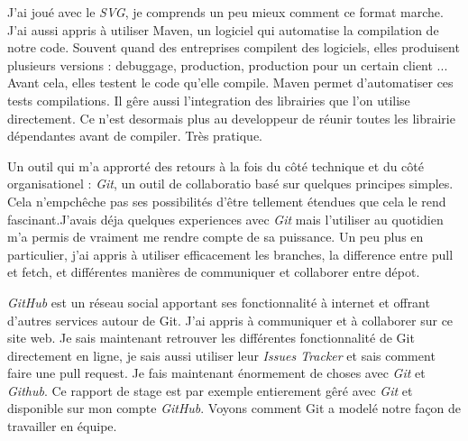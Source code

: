 J'ai joué avec le \textit{SVG}, je comprends un peu mieux comment ce format marche. J'ai aussi appris à utiliser Maven, un logiciel qui automatise la compilation de notre code. Souvent quand des entreprises compilent des logiciels, elles produisent plusieurs versions : debuggage, production, production pour un certain client ... Avant cela, elles testent le code qu'elle compile. Maven permet d'automatiser ces tests compilations. Il gêre aussi l'integration des librairies que l'on utilise directement. Ce n'est desormais plus au developpeur de réunir toutes les librairie dépendantes avant de compiler. Très pratique. 

Un outil qui m'a approrté des retours à la fois du côté technique et du côté organisationel : \textit{Git}, un outil de collaboratio  basé sur quelques principes simples. Cela n'empchêche pas ses possibilités d'être tellement étendues que cela le rend fascinant.J'avais déja quelques experiences avec \textit{Git} mais l'utiliser au quotidien m'a permis de vraiment me rendre compte de sa puissance. Un peu plus en particulier, j'ai appris à utiliser efficacement les branches, la difference entre pull et fetch, et différentes manières de communiquer et collaborer entre dépot.

\textit{GitHub} est un réseau social apportant ses fonctionnalité à internet et offrant d'autres services autour de Git. J'ai appris à communiquer et à collaborer sur ce site web. Je sais maintenant retrouver les différentes fonctionnalité de Git directement en ligne, je sais aussi utiliser leur \textit{Issues Tracker} et sais comment faire une pull request. Je fais maintenant énormement de choses avec \textit{Git} et \textit{Github}. Ce rapport de stage est par exemple entierement gêré avec \textit{Git} et disponible sur mon compte \textit{GitHub}.
Voyons comment Git a modelé notre façon de travailler en équipe.



